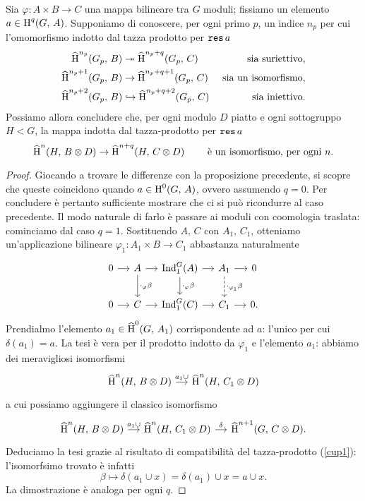 \begin{proposition}
	Sia $ \varphi \colon A \times B \to C $ una mappa bilineare tra $ G $ moduli; fissiamo un elemento $ a \in \operatorname{H}^q(G, \, A) $. Supponiamo di conoscere, per ogni primo $ p $, un indice $ n_p $ per cui l'omomorfismo indotto dal tazza prodotto per $ \operatorname{\mathtt{res}} a $
	\begin{align*}
	\operatorname{\widehat{H}}^{n_p}(G_p,\, B) &\twoheadrightarrow \operatorname{\widehat{H}}^{n_p+q}(G_p,\, C) & \text{ sia suriettivo,} \\
	\operatorname{\widehat{H}}^{n_p+1}(G_p,\, B) &\to \operatorname{\widehat{H}}^{n_p+q+1}(G_p,\, C) & \text{ sia un isomorfismo,} \\
	\operatorname{\widehat{H}}^{n_p+2}(G_p,\, B) &\hookrightarrow \operatorname{\widehat{H}}^{n_p+q+2}(G_p,\, C) & \text{ sia iniettivo.}
	\end{align*}
	Possiamo allora concludere che, per ogni modulo $ D $ piatto e ogni sottogruppo $ H < G $, la mappa indotta dal tazza-prodotto per $ \operatorname{\mathtt{res}} a $
	\[ \operatorname{\widehat{H}}^n(H, \, B \otimes D) \to \operatorname{\widehat{H}}^{n+q}(H, \,  C\otimes D) \qquad\text{ è un isomorfismo, per ogni } n. \]
\end{proposition}

\begin{proof}
	Giocando a trovare le differenze con la proposizione precedente, si scopre che queste coincidono quando $ a \in \operatorname{H}^0(G, \, A) $, ovvero assumendo $ q = 0. $ Per concludere è pertanto sufficiente mostrare che ci si può ricondurre al caso precedente. Il modo naturale di farlo è passare ai moduli con coomologia traslata: cominciamo dal caso $ q = 1 $. Sostituendo $ A, \, C $ con $ A_1 ,\,  C_1 $, otteniamo un'applicazione bilineare $ \varphi_1\colon A_1 \times B \to C_1 $ abbastanza naturalmente
	\[ \begin{tikzcd}[column sep = small]
	0 \rar
	& A \rar \dar["\cdot_\varphi\beta"]
	& \Ind_1^G(A) \rar \dar["\cdot_\varphi\beta"]
	& A_1 \rar \dar["\cdot_{\varphi_1}\beta", dashed]
	& 0\\
	0 \rar & C \rar & \Ind_1^G(C) \rar & C_1 \rar & 0.  \end{tikzcd} \]
	Prendialmo l'elemento $ a_1 \in \operatorname{\widehat{H}}^0(G, \, A_1) $ corrispondente ad $ a $: l'unico per cui $ \delta(a_1) = a $. La tesi è vera per il prodotto indotto da $ \varphi_1 $ e l'elemento $ a_1 $: abbiamo dei meravigliosi isomorfismi
	\[ \begin{tikzcd}[column sep = small]
	\Hh^n(H, \, B \otimes D) \rar["a_1\cup"] & \Hh^{n}(H, \,  C_1 \otimes D)
	\end{tikzcd}  \]
	a cui possiamo aggiungere il classico isomorfismo
	\[ \begin{tikzcd}[column sep = small]
	\Hh^n(H, \, B \otimes D) \rar["a_1\cup"] & \Hh^{n}(H, \,  C_1 \otimes D) \rar["\delta"] & \Hh^{n+1}(G, \, C \otimes D).
	\end{tikzcd}  \]
	Deduciamo la tesi grazie al risultato di compatibilità del tazza-prodotto (\ref{cup1}): l'isomorfsimo trovato è infatti $$  \beta \mapsto \delta(a_1 \cup x) = \delta(a_1) \cup x = a \cup x.  $$ La dimostrazione è analoga per ogni $ q $.
\end{proof}

